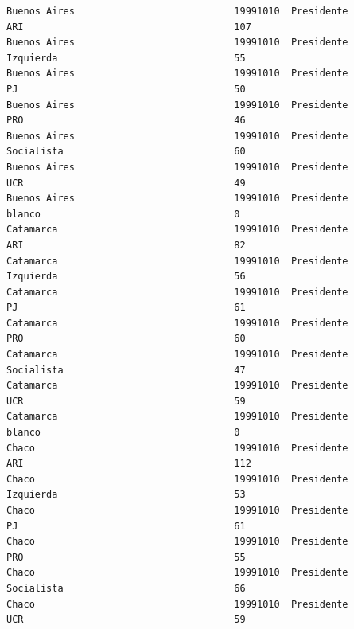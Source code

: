 \documentclass[a4paper,10pt]{article}
\begin{document}
\begin{verbatim}
Buenos Aires                            19991010  Presidente                    ARI                                     107            
Buenos Aires                            19991010  Presidente                    Izquierda                               55             
Buenos Aires                            19991010  Presidente                    PJ                                      50             
Buenos Aires                            19991010  Presidente                    PRO                                     46             
Buenos Aires                            19991010  Presidente                    Socialista                              60             
Buenos Aires                            19991010  Presidente                    UCR                                     49             
Buenos Aires                            19991010  Presidente                    blanco                                  0              
Catamarca                               19991010  Presidente                    ARI                                     82             
Catamarca                               19991010  Presidente                    Izquierda                               56             
Catamarca                               19991010  Presidente                    PJ                                      61             
Catamarca                               19991010  Presidente                    PRO                                     60             
Catamarca                               19991010  Presidente                    Socialista                              47             
Catamarca                               19991010  Presidente                    UCR                                     59             
Catamarca                               19991010  Presidente                    blanco                                  0              
Chaco                                   19991010  Presidente                    ARI                                     112            
Chaco                                   19991010  Presidente                    Izquierda                               53             
Chaco                                   19991010  Presidente                    PJ                                      61             
Chaco                                   19991010  Presidente                    PRO                                     55             
Chaco                                   19991010  Presidente                    Socialista                              66             
Chaco                                   19991010  Presidente                    UCR                                     59             

\end{verbatim}
\end{document}
